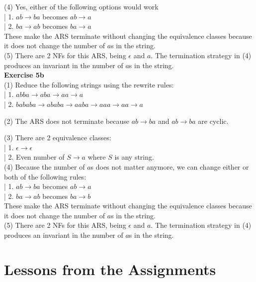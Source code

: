 \documentclass{article}
\theoremstyle{theorem}
\theoremstyle{definition}
\theoremstyle{remark}
\begin{document}
(4) Yes, either of the following options would work\\
|    1. $ab \rightarrow ba$ becomes $ab \rightarrow a$\\
|    2. $ba \rightarrow ab$ becomes $ba \rightarrow a$\\
These make the ARS terminate without changing the equivalence classes because it does not change the number of $a$s in the string.\\

(5) There are 2 NFs for this ARS, being $\epsilon$ and $a$. The termination strategy in (4) produces an invariant in the number of $a$s in the string.\\

  \textbf{Exercise 5b}\\

  (1) Reduce the following strings using the rewrite rules:\\
    |    1. $abba \rightarrow aba \rightarrow aa \rightarrow a$\\
    |    2. $bababa \rightarrow ababa \rightarrow aaba \rightarrow aaa \rightarrow aa \rightarrow a$

  (2) The ARS does not terminate because $ab \rightarrow ba$ and $ab \rightarrow ba$ are cyclic.

  (3) There are 2 equivalence classes:\\
    |    1. $\epsilon \rightarrow \epsilon$\\
    |    2. Even number of $S \rightarrow a$ where $S$ is any string.\\

  (4) Because the number of $a$s does not matter anymore, we can change either or both of the following rules:\\
    |    1. $ab \rightarrow ba$ becomes $ab \rightarrow a$\\
    |    2. $ba \rightarrow ab$ becomes $ba \rightarrow b$\\
    These make the ARS terminate without changing the equivalence classes because it does not change the number of $a$s in the string.\\

  (5) There are 2 NFs for this ARS, being $\epsilon$ and $a$. The termination strategy in (4) produces an invariant in the number of $a$s in the string.\\

\section{Lessons from the Assignments}
\end{document}

